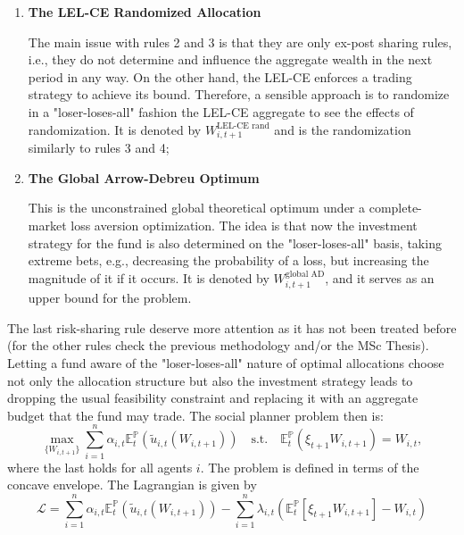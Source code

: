 \documentclass[11pt,a4paper]{article}
\theoremstyle{definition}
\theoremstyle{plain}
\theoremstyle{remark}
\newcommand{\E}{\mathbb{E}}
\renewcommand{\P}{\mathbb{P}}
\newcommand{\1}{\mathbf{1}}
\begin{document}
\begin{enumerate}
    This follows exactly the framework described in Section 4.6 of the thesis, that combines the ideas of \citet{NgNguyen2025} and \citet{Dong2020}, with the allocation denoted by $W_{i,t+1}^{\text{LEL-CE}}$. We take the bound $\epsilon = 0.005 \times W_{t}$;

    \item \textbf{The LEL-CE Randomized Allocation}
    
    The main issue with rules 2 and 3 is that they are only ex-post sharing rules, i.e., they do not determine and influence the aggregate wealth in the next period in any way. On the other hand, the LEL-CE enforces a trading strategy to achieve its bound. Therefore, a sensible approach is to randomize in a "loser-loses-all" fashion the LEL-CE aggregate to see the effects of randomization. It is denoted by $W_{i,t+1}^{\text{LEL-CE rand}}$ and is the randomization similarly to rules 3 and 4;

    \item \textbf{The Global Arrow-Debreu Optimum}
    
    This is the unconstrained global theoretical optimum under a complete-market loss aversion optimization. The idea is that now the investment strategy for the fund is also determined on the "loser-loses-all" basis, taking extreme bets, e.g., decreasing the probability of a loss, but increasing the magnitude of it if it occurs. It is denoted by $W_{i,t+1}^{\text{global AD}}$, and it serves as an upper bound for the problem.
\end{enumerate}
The last risk-sharing rule deserve more attention as it has not been treated before (for the other rules check the previous methodology and/or the MSc Thesis). Letting a fund aware of the "loser-loses-all" nature of optimal allocations choose not only the allocation structure but also the investment strategy leads to dropping the usual feasibility constraint and replacing it with an aggregate budget that the fund may trade. The social planner problem then is:
\begin{equation*}
    \max_{\{W_{i,t+1}\}} \sum_{i=1}^n \alpha_{i,t} \E_t^\P(\tilde{u}_{i,t}(W_{i,t+1})) \quad \text{s.t.} \quad \E_t^{\P}\left(\xi_{t+1} W_{i,t+1} \right) = W_{i,t},
\end{equation*}
where the last holds for all agents $i$. The problem is defined in terms of the concave envelope. The Lagrangian is given by
\begin{equation*}
    \mathcal{L} = \sum_{i=1}^n \alpha_{i,t} \E_t^\P(\tilde{u}_{i,t}(W_{i,t+1})) - \sum_{i=1}^n \lambda_{i,t} \left( \E_t^\P[\xi_{t+1} W_{i,t+1}] - W_{i,t} \right)
\end{equation*}
\end{document}
